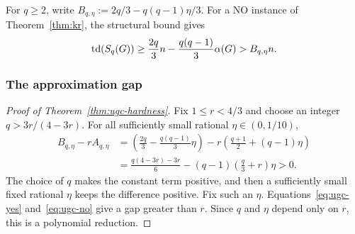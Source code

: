 For $q\geq2$, write $B_{q,\eta}:=2q/3-q(q-1)\eta/3$.
For a NO instance of Theorem~\ref{thm:kr}, the structural bound gives
\begin{equation}\label{eq:ugc-no}
 \operatorname{td}(S_q(G))\geq\frac{2q}{3}n-\frac{q(q-1)}3\alpha(G)
 >B_{q,\eta}n.
\end{equation}

\subsubsection{The approximation gap}

\begin{proof}[Proof of Theorem~\ref{thm:ugc-hardness}]
Fix $1\leq r<4/3$ and choose an integer $q>3r/(4-3r)$.
For all sufficiently small rational $\eta\in(0,1/10)$,
\[
\begin{aligned}
 B_{q,\eta}-rA_{q,\eta}
 &=\left(\frac{2q}{3}-\frac{q(q-1)}3\eta\right)
   -r\left(\frac{q+1}{2}+(q-1)\eta\right)\\
 &=\frac{q(4-3r)-3r}{6}
   -(q-1)\left(\frac q3+r\right)\eta>0.
\end{aligned}
\]
The choice of $q$ makes the constant term positive, and then a
sufficiently small fixed rational $\eta$ keeps the difference positive.
Fix such an $\eta$. Equations~\eqref{eq:ugc-yes} and~\eqref{eq:ugc-no}
give a gap greater than $r$. Since $q$ and $\eta$ depend only
on $r$, this is a polynomial reduction.
\end{proof}
